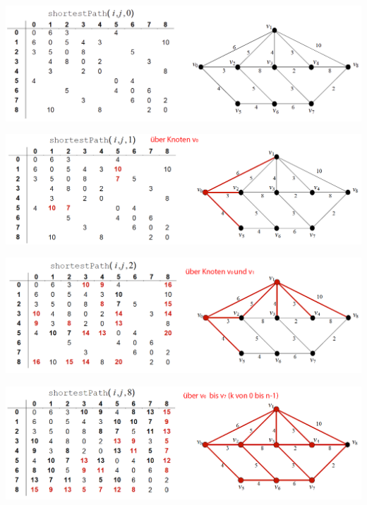 \begin{minipage}{0.5\textwidth}
	\includegraphics[width=\textwidth]{Content/Graphen/FloydWarshall1.png}
\end{minipage}
\begin{minipage}{0.5\textwidth}
	\includegraphics[width=\textwidth]{Content/Graphen/FloydWarshall2.png}
\end{minipage}
\begin{minipage}{0.5\textwidth}
	\includegraphics[width=\textwidth]{Content/Graphen/FloydWarshall3.png}
\end{minipage}
\begin{minipage}{0.5\textwidth}
	\includegraphics[width=\textwidth]{Content/Graphen/FloydWarshall4.png}
\end{minipage}

